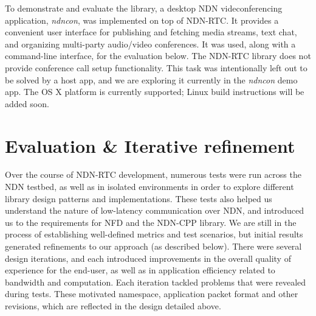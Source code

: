 \documentclass{icn/sig-alternate-2013} %
\newcommand{\ndnrtcName}{NDN-RTC} %
\newcommand{\ndnconName}{\emph{ndncon}}
\begin{document}

To demonstrate and evaluate the library, a desktop NDN videconferencing application, \ndnconName{}, \cite{ndncon} was implemented on top of \ndnrtcName{}. It provides a convenient user interface for publishing and fetching media streams, text chat, and organizing multi-party audio/video conferences. It was used, along with a command-line interface, for the evaluation below.
The \ndnrtcName{} library does not provide conference call setup functionality. This task was intentionally left out to be solved by a host app, and we are exploring it currently in the \ndnconName{} demo app.  The OS X platform is currently supported; Linux build instructions will be added soon. %

\section{Evaluation \& Iterative refinement}
\label{sec:eval} 
Over the course of \ndnrtcName{} development, numerous tests were run across the NDN testbed, as well as in isolated environments in order to explore different library design patterns and implementations. These tests also helped us understand the nature of low-latency communication over NDN, and introduced us to the requirements for NFD and the NDN-CPP library. We are still in the process of establishing well-defined metrics and test scenarios, but initial results generated refinements to our approach (as described below).
There were several design iterations, and each introduced improvements in the overall quality of experience for the end-user, as well as in application efficiency related to bandwidth and computation. Each iteration tackled problems that were revealed during tests. These motivated namespace, application packet format and other revisions, which are reflected in the design detailed above.%
\end{document}
